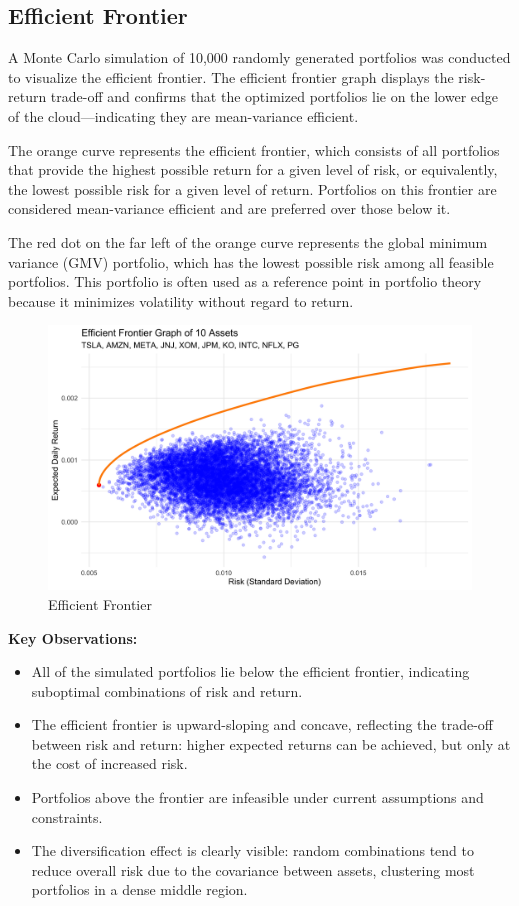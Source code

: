 \documentclass[11pt]{article}
\begin{document}
\subsection*{Efficient Frontier}
A Monte Carlo simulation of 10,000 randomly generated portfolios was conducted to visualize the efficient frontier. The efficient frontier graph displays the risk-return trade-off and confirms that the optimized portfolios lie on the lower edge of the cloud—indicating they are mean-variance efficient.\par
The orange curve represents the efficient frontier, which consists of all portfolios that provide the highest possible return for a given level of risk, or equivalently, the lowest possible risk for a given level of return. Portfolios on this frontier are considered mean-variance efficient and are preferred over those below it.\par
The red dot on the far left of the orange curve represents the global minimum variance (GMV) portfolio, which has the lowest possible risk among all feasible portfolios. This portfolio is often used as a reference point in portfolio theory because it minimizes volatility without regard to return.\\
\begin{figure}[H]
    \centering
    \includegraphics[width=0.6\linewidth]{Findings_Yutong/efficient_frontier_plot.png}
    \caption{Efficient Frontier}
    \label{eff-fro}
\end{figure}
\textbf{Key Observations:}
\begin{itemize}
    \item All of the simulated portfolios lie below the efficient frontier, indicating suboptimal combinations of risk and return.
    \item The efficient frontier is upward-sloping and concave, reflecting the trade-off between risk and return: higher expected returns can be achieved, but only at the cost of increased risk.
    \item Portfolios above the frontier are infeasible under current assumptions and constraints.
    \item The diversification effect is clearly visible: random combinations tend to reduce overall risk due to the covariance between assets, clustering most portfolios in a dense middle region.
\end{itemize}
\end{document}
